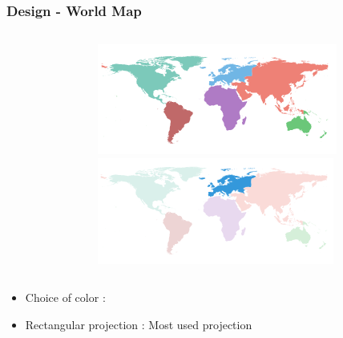 \documentclass{beamer}
\begin{document}
\begin{frame}
\frametitle{Design - World Map}

\begin{columns}[T]
  \begin{column}{.7\textwidth}
    \begin{table}
    \end{table}
  \end{column}
  \begin{column}{.25\textwidth}
    \begin{figure}
      \centering
      \includegraphics[scale=0.3]{img/map.png} \\
      \includegraphics[scale=0.3]{img/map_selected.png}
    \end{figure}
  \end{column}
\end{columns}
\begin{itemize}
\item Choice of color : 
\item Rectangular projection : Most used projection  
\end{itemize}
\end{frame}
\end{document}
